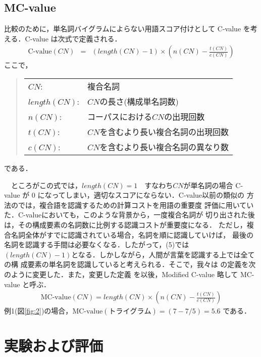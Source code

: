 \subsection{MC-value}\label{sec36}

比較のために，単名詞バイグラムによらない用語スコア付けとして C-value
\cite{FrantziAnaniadou96}を考える．C-value は次式で定義される．
\begin{eqnarray}
\mbox{C-value}(CN)&=&(length(CN)-1)\times (n(CN)-\frac{t(CN)}{c(CN)})
\end{eqnarray}
ここで，
\begin{quote}
 \begin{tabular}{ll}
  $CN$: & 複合名詞\footnotemark\\
  $length(CN)$: & $CN$の長さ(構成単名詞数)\\
  $n(CN)$: & コーパスにおける$CN$の出現回数\\
  $t(CN)$: & $CN$を含むより長い複合名詞の出現回数\\
  $c(CN)$: & $CN$を含むより長い複合名詞の異なり数
 \end{tabular}
\end{quote}
である．

　ところがこの式では，$length(CN)=1$　すなわち$CN$が単名詞の場合 
C-value が 0 になってしまい，適切なスコアにならない．C-value以前の類似の
方法の\cite{kita94}では，複合語を認識するための計算コストを用語の重要度
評価に用いていた．C-valueにおいても，このような背景から，一度複合名詞が
切り出された後は，その構成要素の名詞数に比例する認識コストが重要度になる．
ただし，複合名詞全体がすでに認識されている場合，名詞を順に認識していけば，
最後の名詞を認識する手間は必要なくなる．したがって，(5)では
$(length(CN)-1)$となる．しかしながら，人間が言葉を認識する上では全ての構
成要素の単名詞を認識していると考えられる．そこで，我々は
\cite{FrantziAnaniadou96}の定義を次のように変更した．また，変更した定義
を以後，Modified C-value 略して MC-value と呼ぶ．
\begin{eqnarray}
\mbox{MC-value}(CN)=length(CN)\times (n(CN)-\frac{t(CN)}{c(CN)})
\end{eqnarray}
例1(図\ref{fig:2})の場合，$\mbox{MC-value}(トライグラム)=(7-7/5)=5.6$ である．
	
\section{実験および評価}
